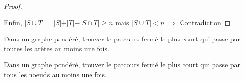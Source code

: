\begin{mytheo} 
\begin{proof}
\begin{figure} [!h]
    \end{figure}
	\newline \newline
	Enfin, $\vert S \cup T \vert = \vert S \vert + \vert T \vert - \vert S \cap T \vert \geq n$ mais $\vert S \cup T \vert < n$ $\Rightarrow$ Contradiction
  \end{proof}
\end{mytheo}

\begin{mydef} 
  Dans un graphe pondéré, trouver le parcours fermé le plus court qui passe par toutes les arêtes au moins une fois.
\end{mydef}

\begin{mydef} 
  Dans un graphe pondéré, trouver le parcours fermé le plus court qui passe par tous les noeuds au moins une fois.
\end{mydef}
